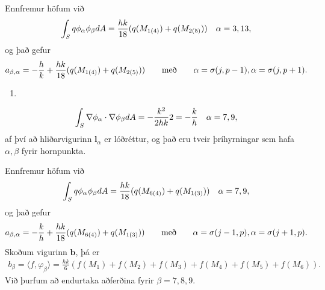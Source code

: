 \documentclass[a4paper,10pt,icelandic]{sphinxmanual}
\begin{document}
Ennfremur höfum við
\begin{equation*}
\begin{split}\int_S q \phi_\alpha \phi_\beta dA={hk\over 18}(q(M_{1(4)})+q(M_{2(5)}))  \quad \alpha=3, 13,\end{split}
\end{equation*}
og það gefur
\begin{equation*}
\begin{split}a_{\beta,\alpha}=-{h\over k}+{hk\over 18}(q(M_{1(4)})+q(M_{2(5)}))  \qquad \text{með}\qquad \alpha=\sigma(j,p-1),\alpha=\sigma(j,p+1) .\end{split}
\end{equation*}\begin{enumerate}
\def\theenumi{\arabic{enumi}}
\def\labelenumi{\theenumi .}
\makeatletter\def\p@enumii{\p@enumi \theenumi .}\makeatother
\setcounter{enumi}{2}
\item {} 
\end{enumerate}
\begin{equation*}
\begin{split}\int_S \nabla \phi_\alpha\cdot \nabla \phi_\beta dA=-{k^2\over 2 h k} 2=-{k\over h}  \quad \alpha=7, 9,\end{split}
\end{equation*}
af því að hliðarvigurinn \(\mathbf{l}_\alpha\) er lóðréttur, og það eru tveir þríhyrningar sem hafa \(\alpha, \beta\) fyrir hornpunkta.

Ennfremur höfum við
\begin{equation*}
\begin{split}\int_S q \phi_\alpha \phi_\beta dA={hk\over 18}(q(M_{6(4)})+q(M_{1(3)}))  \quad \alpha=7, 9,\end{split}
\end{equation*}
og það gefur
\begin{equation*}
\begin{split}a_{\beta,\alpha}=-{k\over h} +{hk\over 18}(q(M_{6(4)})+q(M_{1(3)})) \qquad \text{með}\qquad \alpha=\sigma(j-1,p),\alpha=\sigma(j+1,p).\end{split}
\end{equation*}
Skoðum vigurinn \(\mathbf b\), þá er
\begin{equation*}
\begin{split}b_\beta=\langle f, \varphi_\beta\rangle= \frac{h k}{6} \left(f(M_1)+f(M_2)+f(M_3)+f(M_4)+f(M_5)+f(M_6)\right).\end{split}
\end{equation*}
Við þurfum að endurtaka aðferðina fyrir \(\beta=7,8,9\).
\end{document}
